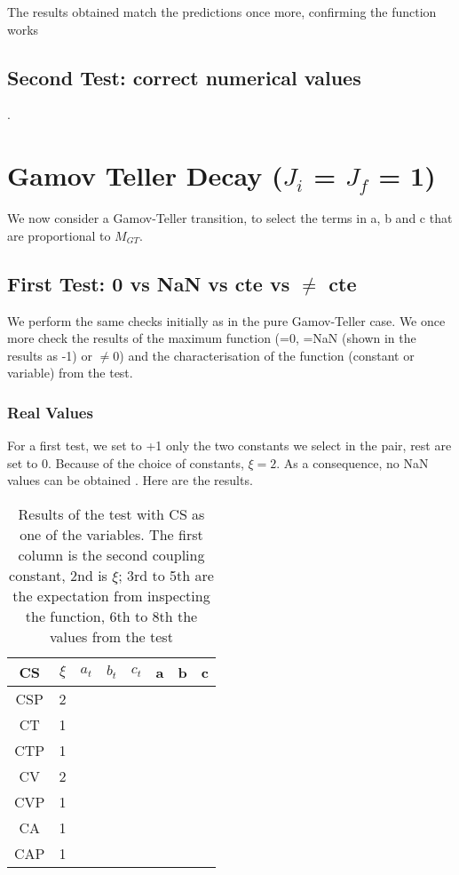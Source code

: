 \documentclass[twocolumn]{article}
\begin{document}
The results obtained match the predictions once more, confirming the function works

\subsection{Second Test: correct numerical values}.

\section{Gamov Teller Decay ($J_i$ = $J_f$ = 1)}

We now consider a Gamov-Teller  transition, to select the terms in a, b and c that are proportional to $M_{GT}$. 


\subsection{First Test:  0 vs NaN vs cte  vs $\neq$ cte}

We perform the same checks initially as in the pure Gamov-Teller case. We once more check the results of the maximum function (=0, =NaN (shown in the results as -1) or $\neq$0) and the characterisation of the function (constant or variable) from the test. 

\subsubsection{Real Values}

For a first test, we set to +1 only the two constants we select in the pair, rest are set to 0. Because of the choice of constants, $\xi=2$. As a consequence, no NaN values can be obtained . Here are the results.

\begin{table}[H]
	\begin{tabular}{|c|c|c|c|c|c|c|c|}
		\hline
		CS & $\xi $& $a_t$ & $b_t$ & $c_t$ & a & b & c \\
		\hline
		CSP & 2 &   &   &   &   &   &  \\
		\hline
		CT & 1 &   &   &   &   &   &  \\
		\hline
		CTP & 1 &   &   &   &   &   &  \\
		\hline
		CV & 2 &   &   &   &   &   &  \\
		\hline
		CVP & 1 &   &   &   &   &   &  \\
		\hline
		CA & 1 &   &   &   &   &   &  \\
		\hline
		CAP & 1 &   &   &   &   &   &  \\
		\hline
	\end{tabular}
	\caption{Results of the test with CS as one of the variables. The first column is the second coupling constant, 2nd is $\xi$; 3rd to 5th are the expectation from inspecting the function, 6th to 8th the values from the test}
\end{table}
\end{document}
